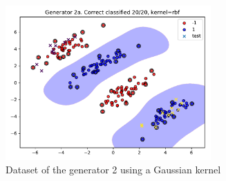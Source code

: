 \documentclass[a4paper]{article}
\begin{document}
\begin{figure}[H]
	\centering
	\includegraphics[width=0.7\textwidth]{ex1/2a.pdf}
	\caption{Dataset of the generator 2 using a Gaussian kernel}
	\label{fig:ex1gen2a}
\end{figure}
%
\end{document}
